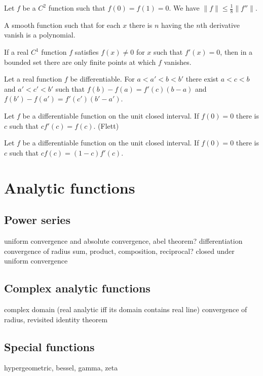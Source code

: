 \documentclass{../note}
\begin{document}
\begin{prb}
Let $f$ be a $C^2$ function such that $f(0)=f(1)=0$.
We have $\|f\|\le\frac18\|f''\|$.
\end{prb}

\begin{prb}
A smooth function such that for each $x$ there is $n$ having the $n$th derivative vanish is a polynomial.
\end{prb}

\begin{prb}
If a real $C^1$ function $f$ satisfies $f(x)\ne0$ for $x$ such that $f'(x)=0$, then in a bounded set there are only finite points at which $f$ vanishes.
\end{prb}

\begin{prb}
Let a real function $f$ be differentiable.
For $a<a'<b<b'$ there exist $a<c<b$ and $a'<c'<b'$ such that $f(b)-f(a)=f'(c)(b-a)$ and $f(b')-f(a')=f'(c')(b'-a')$.
\end{prb}

\begin{prb}
Let $f$ be a differentiable function on the unit closed interval.
If $f(0)=0$ there is $c$ such that $cf'(c)=f(c)$. (Flett)
\end{prb}

\begin{prb}
Let $f$ be a differentiable function on the unit closed interval.
If $f(0)=0$ there is $c$ such that $cf(c)=(1-c)f'(c)$.
\end{prb}


\chapter{Analytic functions}
\section{Power series}
uniform convergence and absolute convergence, abel theorem?
differentiation
convergence of radius
sum, product, composition, reciprocal?
closed under uniform convergence
\section{Complex analytic functions}
complex domain
(real analytic iff its domain contains real line)
convergence of radius, revisited
identity theorem
\section{Special functions}
hypergeometric, bessel, gamma, zeta
\end{document}

